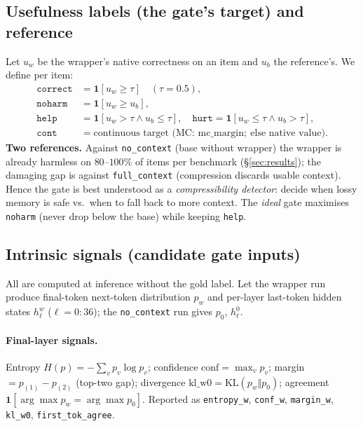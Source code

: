 \documentclass[11pt]{article}
\newcommand{\noctx}{\texttt{no\_context}}
\newcommand{\fullctx}{\texttt{full\_context}}
\newcommand{\code}[1]{\texttt{#1}}
\begin{document}
\subsection{Usefulness labels (the gate's target) and reference}
\label{sec:usefulness}
Let $u_w$ be the wrapper's native correctness on an item and $u_b$ the
reference's. We define per item:
\begin{align*}
\texttt{correct} &= \mathbf{1}[u_w \ge \tau] \quad(\tau{=}0.5),\\
\texttt{noharm}  &= \mathbf{1}[u_w \ge u_b],\\
\texttt{help} &= \mathbf{1}[u_w{>}\tau \wedge u_b{\le}\tau],\quad
\texttt{hurt} = \mathbf{1}[u_w{\le}\tau \wedge u_b{>}\tau],\\
\texttt{cont} &= \text{continuous target (MC: } \mathrm{mc\_margin};\ \text{else native value)}.
\end{align*}
\textbf{Two references.} Against \noctx{} (base without wrapper) the
wrapper is already harmless on $80$--$100\%$ of items per benchmark
(\S\ref{sec:results}); the damaging gap is against \fullctx{}
(compression discards usable context). Hence the gate is best understood
as a \emph{compressibility detector}: decide when lossy memory is safe
vs.\ when to fall back to more context. The \emph{ideal} gate maximises
\texttt{noharm} (never drop below the base) while keeping \texttt{help}.

\subsection{Intrinsic signals (candidate gate inputs)}
\label{sec:intrinsic}
All are computed at inference without the gold label. Let the wrapper
run produce final-token next-token distribution $p_w$ and per-layer
last-token hidden states $h_\ell^{w}$ ($\ell=0{:}36$); the \noctx{} run
gives $p_0$, $h_\ell^{0}$.

\paragraph{Final-layer signals.}
Entropy $H(p)=-\sum_v p_v\log p_v$; confidence $\mathrm{conf}=\max_v p_v$;
margin $=p_{(1)}-p_{(2)}$ (top-two gap); divergence
$\mathrm{kl\_w0}=\mathrm{KL}(p_w\Vert p_0)$; agreement
$\mathbf{1}[\arg\max p_w=\arg\max p_0]$. Reported as \code{entropy\_w},
\code{conf\_w}, \code{margin\_w}, \code{kl\_w0}, \code{first\_tok\_agree}.
\end{document}
